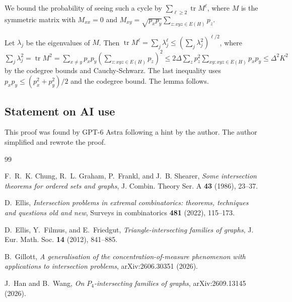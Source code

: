 \documentclass[11pt]{article}
\newcommand{\1}{\mathbf 1}
\newcommand{\tr}{\operatorname{tr}}
\begin{document}
We bound the probability of seeing such a cycle by 
$\sum_{\ell \ge 2} \tr M^\ell$, where $M$ is the symmetric matrix with
$M_{xx}=0$ and $M_{xy} = \sqrt{p_xp_y}\sum_{z: xyz \in E(H)}p_z$.

Let \(\lambda_j\) be the eigenvalues of \(M\). Then
$\tr M^\ell = \sum_j \lambda_j^\ell \le\left(\sum_j\lambda_j^2\right)^{\ell/2}$,
where $\sum_j\lambda_j^2 = \tr M^2 = \sum_{x\ne y}p_xp_y
    \left(\sum_{z: xyz \in E(H) }p_z\right)^2 \le   
    2\Delta \sum_z p_z^2 \sum_{xy: xyz \in E(H)} p_xp_y
    \le \Delta^2K^2 $
by the codegree bounds and Cauchy-Schwarz.
The last inequality uses $p_x p_y \le (p_x^2+p_y^2)/2$
and the codegree bound. The lemma follows.

\subsection*{Statement on AI use}

This proof was found by GPT-6 Astra following a hint by the author.
The author simplified and rewrote the proof.

\begin{thebibliography}{99}

F.~R.~K. Chung, R.~L. Graham, P.~Frankl, and J.~B. Shearer,
\emph{Some intersection theorems for ordered sets and graphs},
J. Combin. Theory Ser. A \textbf{43} (1986), 23--37.

D.~Ellis,
\emph{Intersection problems in extremal combinatorics: theorems, techniques and questions old and new},
Surveys in combinatorics \textbf{481} (2022), 115--173.

D.~Ellis, Y.~Filmus, and E.~Friedgut,
\emph{Triangle-intersecting families of graphs},
J. Eur. Math. Soc. \textbf{14} (2012), 841--885.

B.~Gillott,
\emph{A generalisation of the concentration-of-measure phenomenon with applications to intersection problems},
arXiv:2606.30351 (2026).

J.~Han and B.~Wang,
\emph{On $P_4$-intersecting families of graphs},
arXiv:2609.13145 (2026).

\end{thebibliography}
\end{document}
